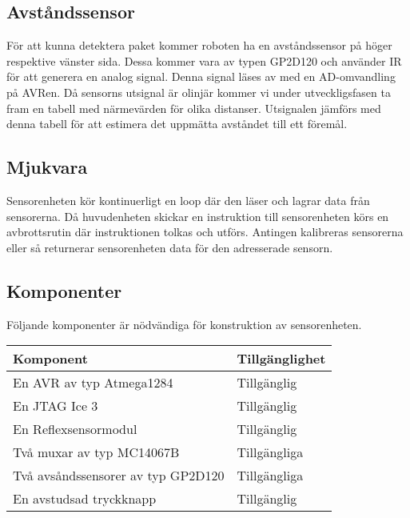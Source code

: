 \subsection{Avståndssensor}
För att kunna detektera paket kommer roboten ha en avståndssensor på höger respektive vänster sida. Dessa kommer vara av typen GP2D120 och använder IR för att generera en analog signal. Denna signal läses av med en AD-omvandling på AVRen. Då sensorns utsignal är olinjär kommer vi under utveckligsfasen ta fram en tabell med närmevärden för olika distanser. Utsignalen jämförs med denna tabell för att estimera det uppmätta avståndet till ett föremål.

\subsection{Mjukvara}
Sensorenheten kör kontinuerligt en loop där den läser och lagrar data från sensorerna. Då huvudenheten skickar en instruktion till sensorenheten körs en avbrottsrutin där instruktionen tolkas och utförs. Antingen kalibreras sensorerna eller så returnerar sensorenheten data för den adresserade sensorn.




%

\subsection{Komponenter}
Följande komponenter är nödvändiga för konstruktion av sensorenheten. \\

\begin{tabularx}{\textwidth}{| l | X |}
	\hline
	{\textbf{Komponent}} & {\textbf{Tillgänglighet}} \\\hline
	{En AVR av typ Atmega1284} & {Tillgänglig} \\\hline
	{En JTAG Ice 3} & {Tillgänglig} \\\hline
	{En Reflexsensormodul} & {Tillgänglig} \\\hline
	{Två muxar av typ MC14067B} & {Tillgängliga} \\\hline
	{Två avsåndssensorer av typ GP2D120} & {Tillgängliga} \\\hline
	{En avstudsad tryckknapp} & {Tillgänglig} \\\hline
\end{tabularx}
